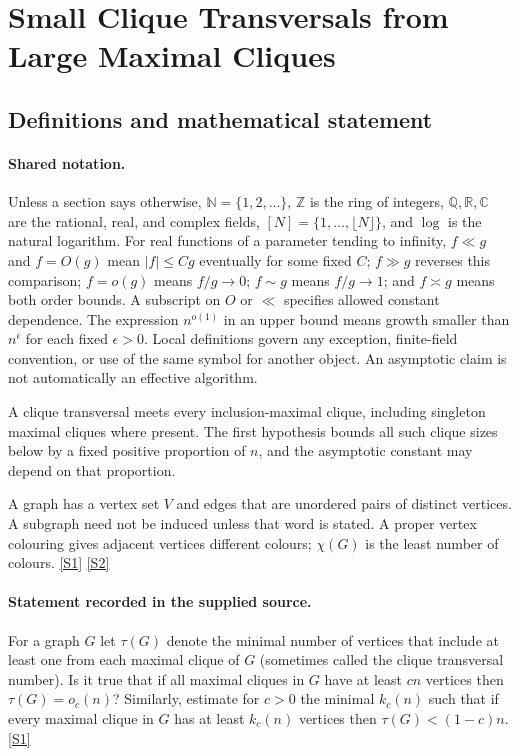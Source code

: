 \documentclass[11pt,a4paper]{article}
\newcommand{\N}{\mathbb{N}}
\newcommand{\Z}{\mathbb{Z}}
\newcommand{\Q}{\mathbb{Q}}
\newcommand{\R}{\mathbb{R}}
\newcommand{\C}{\mathbb{C}}
\newcommand{\sref}[2]{\hyperlink{source:#1:#2}{[S#2]}}
\begin{document}
\section{Small Clique Transversals from Large Maximal Cliques}\label{statement}


\subsection{Definitions and mathematical statement}

\paragraph{Shared notation.}Unless a section says otherwise, $\N=\{1,2,\ldots\}$,
$\Z$ is the ring of integers, $\Q,\R,\C$ are the rational, real, and complex
fields, $[N]=\{1,\ldots,\lfloor N\rfloor\}$, and $\log$ is the natural
logarithm. For real functions of a parameter tending to infinity,
$f\ll g$ and $f=O(g)$ mean $|f|\leq Cg$ eventually for some fixed $C$;
$f\gg g$ reverses this comparison; $f=o(g)$ means $f/g\to0$;
$f\sim g$ means $f/g\to1$; and $f\asymp g$ means both order bounds.
A subscript on $O$ or $\ll$ specifies allowed constant dependence.
The expression $n^{o(1)}$ in an upper bound means growth smaller than
$n^\epsilon$ for each fixed $\epsilon>0$. Local definitions govern any
exception, finite-field convention, or use of the same symbol for another
object. An asymptotic claim is not automatically an effective algorithm.



A clique transversal meets every inclusion-maximal clique, including singleton maximal cliques where present. The first hypothesis bounds all such clique sizes below by a fixed positive proportion of $n$, and the asymptotic constant may depend on that proportion.

A graph has a vertex set $V$ and edges that are unordered pairs of distinct vertices. A subgraph need not be induced unless that word is stated. A proper vertex colouring gives adjacent vertices different colours; $\chi(G)$ is the least number of colours. \sref{statement}{1} \sref{statement}{2}

\paragraph{Statement recorded in the supplied source.}
For a graph $G$ let $\tau(G)$ denote the minimal number of vertices that include at least one from each maximal clique of $G$ (sometimes called the clique transversal number).
Is it true that if all maximal cliques in $G$ have at least $cn$ vertices then $\tau(G)=o_c(n)$?
Similarly, estimate for $c>0$ the minimal $k_c(n)$ such that if every maximal clique in $G$ has at least $k_c(n)$ vertices then $\tau(G)<(1-c)n$. \sref{statement}{1}
\end{document}
